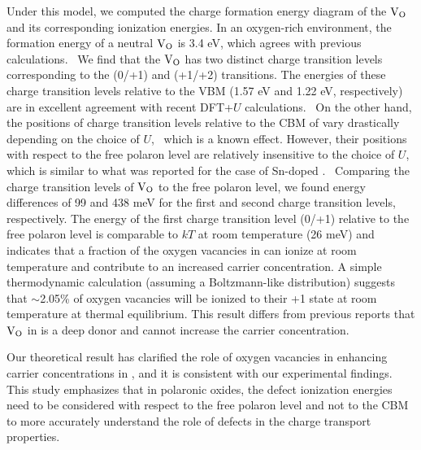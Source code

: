Under this model, we computed the charge formation energy diagram of the $\rm V_O$ and its corresponding ionization energies. In an oxygen-rich environment, the formation energy of a neutral $\rm V_O$ is 3.4 eV, which agrees with previous calculations.~\cite{paudel2012intrinsic,kay2006new,zhang2010density,shimada2016multiferroic} We find that the $\rm V_O$ has two distinct charge transition levels corresponding to the (0/+1) and (+1/+2) transitions. The energies of these charge transition levels relative to the VBM (1.57 eV and 1.22 eV, respectively) are in excellent agreement with recent DFT+$U$ calculations.~\cite{geneste2019polarons} On the other hand, the positions of charge transition levels relative to the CBM of  vary drastically depending on the choice of $U$,~\cite{paudel2012intrinsic,geneste2019polarons,zhang2010density} which is a known effect. However, their positions with respect to the free polaron level are relatively insensitive to the choice of $U$, which is similar to what was reported for the case of Sn-doped .~\cite{smart2017effect} Comparing the charge transition levels of $\rm V_O$ to the free polaron level, we found energy differences of 99 and 438 meV for the first and second charge transition levels, respectively. The energy of the first charge transition level (0/+1) relative to the free polaron level is comparable to $kT$ at room temperature (26 meV) and indicates that a fraction of the oxygen vacancies in  can ionize at room temperature and contribute to an increased carrier concentration. A simple thermodynamic calculation (assuming a Boltzmann-like distribution) suggests that $\sim$2.05\% of oxygen vacancies will be ionized to their +1 state at room temperature at thermal equilibrium. This result differs from previous reports that $\rm V_O$ in  is a deep donor and cannot increase the carrier concentration.~\cite{paudel2012intrinsic,kay2006new,zhang2010density,shimada2016multiferroic}

Our theoretical result has clarified the role of oxygen vacancies in enhancing carrier concentrations in , and it is consistent with our experimental findings. This study emphasizes that in polaronic oxides, the defect ionization energies need to be considered with respect to the free polaron level and not to the CBM to more accurately understand the role of defects in the charge transport properties.



